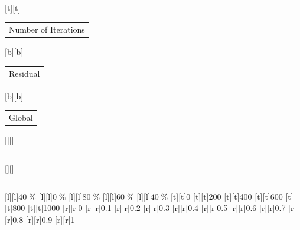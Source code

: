 %    
%
%
\begin{psfrags}%
\psfragscanon%
%
[t][t]{\color[rgb]{0,0,0}\setlength{\tabcolsep}{0pt}\begin{tabular}{c}Number of Iterations\end{tabular}}%
[b][b]{\color[rgb]{0,0,0}\setlength{\tabcolsep}{0pt}\begin{tabular}{c}Residual\end{tabular}}%
[b][b]{\color[rgb]{0,0,0}\setlength{\tabcolsep}{0pt}\begin{tabular}{c}Global\end{tabular}}%
[][]{\color[rgb]{0,0,0}\setlength{\tabcolsep}{0pt}\begin{tabular}{c} \end{tabular}}%
[][]{\color[rgb]{0,0,0}\setlength{\tabcolsep}{0pt}\begin{tabular}{c} \end{tabular}}%
[l][l]{\color[rgb]{0,0,0}$40\;\%$}%
[l][l]{\color[rgb]{0,0,0}$ 0\;\%$}%
[l][l]{\color[rgb]{0,0,0}$80\;\%$}%
[l][l]{\color[rgb]{0,0,0}$60\;\%$}%
[l][l]{\color[rgb]{0,0,0}$40\;\%$}%
%
[t][t]{0}%
[t][t]{200}%
[t][t]{400}%
[t][t]{600}%
[t][t]{800}%
[t][t]{1000}%
%
[r][r]{0}%
[r][r]{0.1}%
[r][r]{0.2}%
[r][r]{0.3}%
[r][r]{0.4}%
[r][r]{0.5}%
[r][r]{0.6}%
[r][r]{0.7}%
[r][r]{0.8}%
[r][r]{0.9}%
[r][r]{1}%
%
%
\end{psfrags}%
%

